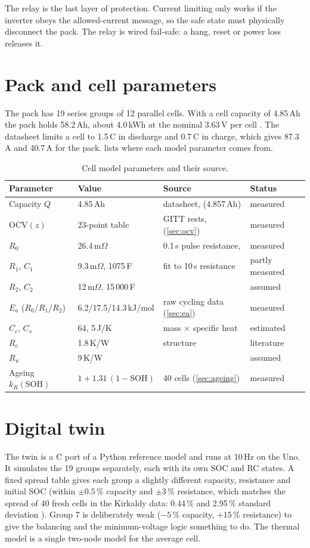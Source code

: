 The relay is the last layer of protection. Current limiting only works if the inverter obeys the allowed-current message, so the safe state must physically disconnect the pack. The relay is wired fail-safe: a hang, reset or power loss releases it.

\section{Pack and cell parameters}
The pack has 19 series groups of 12 parallel cells. With a cell capacity of 4.85\,Ah the pack holds 58.2\,Ah, about 4.0\,kWh at the nominal 3.63\,V per cell \citep{lgm50t}. The datasheet limits a cell to 1.5\,C in discharge and 0.7\,C in charge, which gives 87.3\,A and 40.7\,A for the pack.  lists where each model parameter comes from.

\begin{table}[htbp]\centering\small
\caption{Cell model parameters and their source.}\label{tab:param}
\begin{tabular}{@{}llll@{}}\toprule
Parameter & Value & Source & Status \\\midrule
Capacity $Q$ & 4.85\,Ah & datasheet, \citet{kirkaldy2024} (4.857\,Ah) & measured \\
OCV$(z)$ & 23-point table & GITT rests, \citet{kirkaldy2024} (\cref{sec:ocv}) & measured \\
$R_0$ & 26.4\,m$\Omega$ & 0.1\,s pulse resistance, \citet{kirkaldy2024} & measured \\
$R_1$, $C_1$ & 9.3\,m$\Omega$, 1075\,F & fit to 10\,s resistance & partly measured \\
$R_2$, $C_2$ & 12\,m$\Omega$, 15\,000\,F & & assumed \\
$E_a$ ($R_0$/$R_1$/$R_2$) & 6.2/17.5/14.3\,kJ/mol & raw cycling data (\cref{sec:ea}) & measured \\
$C_c$, $C_s$ & 64, 5\,J/K & mass $\times$ specific heat & estimated \\
$R_c$ & 1.8\,K/W & \citet{lin2014} structure & literature \\
$R_u$ & 9\,K/W & & assumed \\
Ageing $k_R(\mathrm{SOH})$ & $1 + 1.31\,(1-\mathrm{SOH})$ & 40 cells (\cref{sec:ageing}) & measured \\\bottomrule
\end{tabular}
\end{table}

\section{Digital twin}
The twin is a C port of a Python reference model and runs at 10\,Hz on the Uno. It simulates the 19 groups separately, each with its own SOC and RC states. A fixed spread table gives each group a slightly different capacity, resistance and initial SOC (within $\pm0.5$\,\% capacity and $\pm3$\,\% resistance, which matches the spread of 40 fresh cells in the Kirkaldy data: 0.44\,\% and 2.95\,\% standard deviation \citep{kirkaldy2024,rumpf2017}). Group 7 is deliberately weak ($-5$\,\% capacity, $+15$\,\% resistance) to give the balancing and the minimum-voltage logic something to do. The thermal model is a single two-node model for the average cell.

